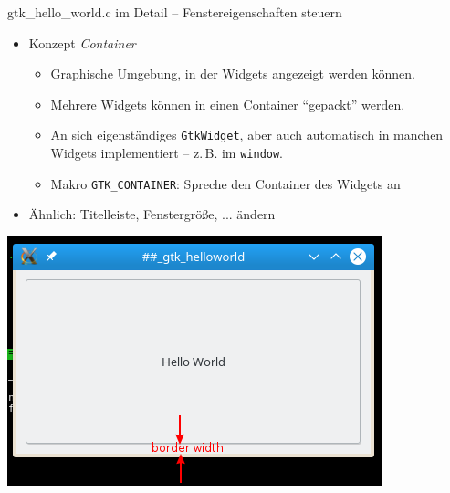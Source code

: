\begin{frame}{gtk\_hello\_world.c im Detail -- Fenstereigenschaften steuern}
%
%
\begin{minipage}{.6\linewidth}
\begin{itemize}
\item Konzept \emph{Container}
	\begin{itemize}
	\item Graphische Umgebung, in der Widgets angezeigt werden können.
	\item Mehrere Widgets können in einen Container \enquote{gepackt} werden.
	\item An sich eigenständiges \texttt{GtkWidget}, aber auch automatisch in manchen Widgets
		implementiert -- z.\,B. im \texttt{window}.
	\item Makro \texttt{GTK\_CONTAINER}: Spreche den Container des Widgets an
	\end{itemize}
\item Ähnlich: Titelleiste, Fenstergröße, ... ändern
\end{itemize}
\end{minipage}
%
\begin{minipage}{.39\linewidth}
\includegraphics[width=\linewidth]{./gfx/gtkHelloWorld}
\end{minipage}
%
\end{frame}


